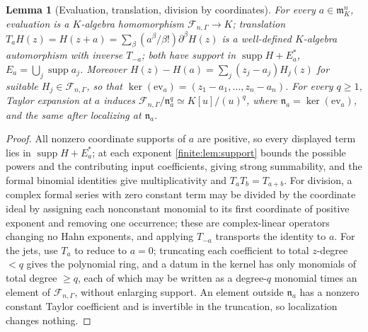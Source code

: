 \documentclass[11pt,letterpaper]{article}
\newtheorem{lemma}[theorem]{Lemma}
\theoremstyle{definition}
\theoremstyle{remark}
\newcommand{\Af}{\mathscr F}
\newcommand{\mm}{\mathfrak m}
\DeclareMathOperator{\supp}{supp}
\numberwithin{equation}{section}
\begin{document}
\begin{lemma}[Evaluation, translation, division by coordinates]
\label{finite:lem:translation}
For every $a\in\mm_K^n$, evaluation is a $K$-algebra homomorphism $\Af_{n,\Gamma}\to K$; translation $T_aH(z)=H(z+a)=\sum_\beta(a^\beta/\beta!)\partial^\beta H(z)$ is a well-defined $K$-algebra automorphism with inverse $T_{-a}$; both have support in $\supp H+E_a^*$, $E_a=\bigcup_j\supp a_j$. Moreover $H(z)-H(a)=\sum_j(z_j-a_j)H_j(z)$ for suitable $H_j\in\Af_{n,\Gamma}$, so that $\ker(\mathrm{ev}_a)=(z_1-a_1,\ldots,z_n-a_n)$. For every $q\geq1$, Taylor expansion at $a$ induces $\Af_{n,\Gamma}/\mathfrak n_a^q\simeq K[u]/(u)^q$, where $\mathfrak n_a=\ker(\mathrm{ev}_a)$, and the same after localizing at $\mathfrak n_a$.
\end{lemma}

\begin{proof}
All nonzero coordinate supports of $a$ are positive, so every displayed term lies in $\supp H+E_a^*$; at each exponent \cref{finite:lem:support} bounds the possible powers and the contributing input coefficients, giving strong summability, and the formal binomial identities give multiplicativity and $T_aT_b=T_{a+b}$. For division, a complex formal series with zero constant term may be divided by the coordinate ideal by assigning each nonconstant monomial to its first coordinate of positive exponent and removing one occurrence; these are complex-linear operators changing no Hahn exponents, and applying $T_{-a}$ transports the identity to $a$. For the jets, use $T_a$ to reduce to $a=0$; truncating each coefficient to total $z$-degree $<q$ gives the polynomial ring, and a datum in the kernel has only monomials of total degree $\geq q$, each of which may be written as a degree-$q$ monomial times an element of $\Af_{n,\Gamma}$, without enlarging support. An element outside $\mathfrak n_a$ has a nonzero constant Taylor coefficient and is invertible in the truncation, so localization changes nothing.
\end{proof}
\end{document}
